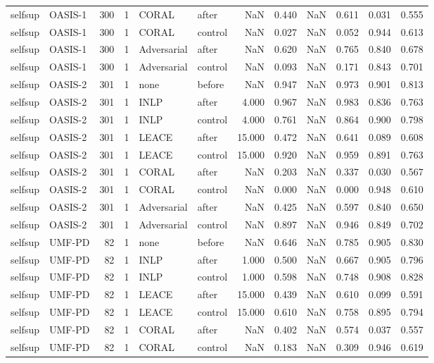 \begin{tabular}{llrrllrrrrrr}
selfsup & OASIS-1 & 300 & 1 & CORAL & after & NaN & 0.440 & NaN & 0.611 & 0.031 & 0.555 \\
selfsup & OASIS-1 & 300 & 1 & CORAL & control & NaN & 0.027 & NaN & 0.052 & 0.944 & 0.613 \\
selfsup & OASIS-1 & 300 & 1 & Adversarial & after & NaN & 0.620 & NaN & 0.765 & 0.840 & 0.678 \\
selfsup & OASIS-1 & 300 & 1 & Adversarial & control & NaN & 0.093 & NaN & 0.171 & 0.843 & 0.701 \\
selfsup & OASIS-2 & 301 & 1 & none & before & NaN & 0.947 & NaN & 0.973 & 0.901 & 0.813 \\
selfsup & OASIS-2 & 301 & 1 & INLP & after & 4.000 & 0.967 & NaN & 0.983 & 0.836 & 0.763 \\
selfsup & OASIS-2 & 301 & 1 & INLP & control & 4.000 & 0.761 & NaN & 0.864 & 0.900 & 0.798 \\
selfsup & OASIS-2 & 301 & 1 & LEACE & after & 15.000 & 0.472 & NaN & 0.641 & 0.089 & 0.608 \\
selfsup & OASIS-2 & 301 & 1 & LEACE & control & 15.000 & 0.920 & NaN & 0.959 & 0.891 & 0.763 \\
selfsup & OASIS-2 & 301 & 1 & CORAL & after & NaN & 0.203 & NaN & 0.337 & 0.030 & 0.567 \\
selfsup & OASIS-2 & 301 & 1 & CORAL & control & NaN & 0.000 & NaN & 0.000 & 0.948 & 0.610 \\
selfsup & OASIS-2 & 301 & 1 & Adversarial & after & NaN & 0.425 & NaN & 0.597 & 0.840 & 0.650 \\
selfsup & OASIS-2 & 301 & 1 & Adversarial & control & NaN & 0.897 & NaN & 0.946 & 0.849 & 0.702 \\
selfsup & UMF-PD & 82 & 1 & none & before & NaN & 0.646 & NaN & 0.785 & 0.905 & 0.830 \\
selfsup & UMF-PD & 82 & 1 & INLP & after & 1.000 & 0.500 & NaN & 0.667 & 0.905 & 0.796 \\
selfsup & UMF-PD & 82 & 1 & INLP & control & 1.000 & 0.598 & NaN & 0.748 & 0.908 & 0.828 \\
selfsup & UMF-PD & 82 & 1 & LEACE & after & 15.000 & 0.439 & NaN & 0.610 & 0.099 & 0.591 \\
selfsup & UMF-PD & 82 & 1 & LEACE & control & 15.000 & 0.610 & NaN & 0.758 & 0.895 & 0.794 \\
selfsup & UMF-PD & 82 & 1 & CORAL & after & NaN & 0.402 & NaN & 0.574 & 0.037 & 0.557 \\
selfsup & UMF-PD & 82 & 1 & CORAL & control & NaN & 0.183 & NaN & 0.309 & 0.946 & 0.619 \\

\end{tabular}
